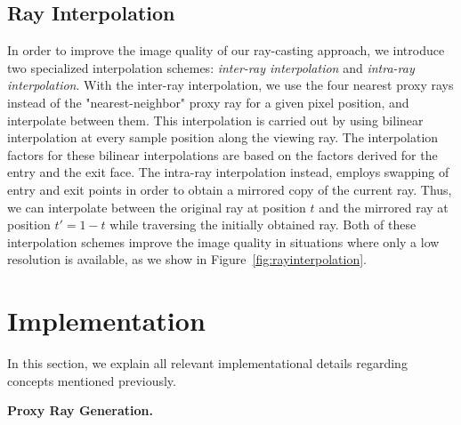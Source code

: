 \documentclass[journal]{vgtc}                %
\begin{document}
\subsection{Ray Interpolation}
In order to improve the image quality of our ray-casting approach, we introduce two specialized interpolation schemes: \emph{inter-ray interpolation} and \emph{intra-ray interpolation}. With the inter-ray interpolation, we use the four nearest proxy rays  instead of the "nearest-neighbor" proxy ray for a given pixel position, and interpolate between them. This interpolation is carried out by using bilinear interpolation at every sample position along the viewing ray. The interpolation factors for these bilinear interpolations are based on the factors derived for the entry and the exit face. The intra-ray interpolation instead, employs swapping of entry and exit points in order to obtain a mirrored copy of the current ray. Thus, we can interpolate between the original ray at position $t$ and the mirrored ray at position $t'=1-t$ while traversing the initially obtained ray. Both of these interpolation schemes improve the image quality in situations where only a low resolution is available, as we show in Figure~\ref{fig:rayinterpolation}.
%
%
%
\section{Implementation}\label{sec:implementation}\label{subsec:limitations}
In this section, we explain all relevant implementational details regarding concepts  mentioned previously.

\noindent \textbf{Proxy Ray Generation.} %
\end{document}
